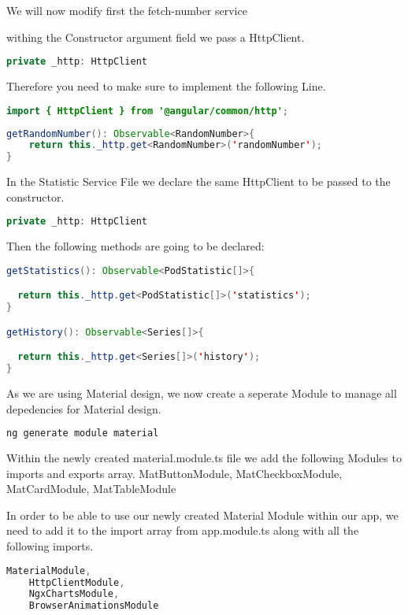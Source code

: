 We will now modify first the fetch-number service

withing the Constructor argument field we pass a HttpClient.
\begin{lstlisting}[language=Java]
private _http: HttpClient
\end{lstlisting}

Therefore you need to make sure to implement the following Line.
\begin{lstlisting}[language=Java]
import { HttpClient } from '@angular/common/http';
\end{lstlisting}

\begin{lstlisting}[language=Java]
getRandomNumber(): Observable<RandomNumber>{
    return this._http.get<RandomNumber>('randomNumber');
}
\end{lstlisting}

In the Statistic Service File we declare the same HttpClient to be passed to the constructor.
\begin{lstlisting}[language=Java]
private _http: HttpClient
\end{lstlisting}

Then the following methods are going to be declared:
\begin{lstlisting}[language=Java]
getStatistics(): Observable<PodStatistic[]>{

  return this._http.get<PodStatistic[]>('statistics');
}

getHistory(): Observable<Series[]>{

  return this._http.get<Series[]>('history');
}
\end{lstlisting}

As we are using Material design, we now create a seperate Module to manage all depedencies for Material design.

\begin{lstlisting}[language=Bash]
ng generate module material
\end{lstlisting}
Within the newly created material.module.ts file we add the following Modules to imports and exports array.
    MatButtonModule,
    MatCheckboxModule,
    MatCardModule,
    MatTableModule

In order to be able to use our newly created Material Module within our app, we need to add it to the import array from app.module.ts along with all the following imports.
\begin{lstlisting}[language=Java]
	MaterialModule,
    HttpClientModule,
    NgxChartsModule,
    BrowserAnimationsModule
\end{lstlisting}
   

